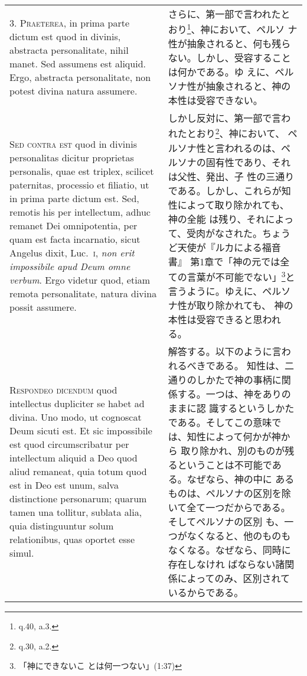 \documentclass[10pt]{jsarticle} %
\begin{document}
\begin{longtable}{p{21em}p{21em}}
3. {\scshape Praeterea}, in prima parte dictum est quod in divinis, abstracta
personalitate, nihil manet. Sed assumens est aliquid. Ergo, abstracta
personalitate, non potest divina natura assumere.


&

さらに、第一部で言われたとおり\footnote{q.40, a.3.}、神において、ペルソ
 ナ性が抽象されると、何も残らない。しかし、受容することは何かである。ゆ
 えに、ペルソナ性が抽象されると、神の本性は受容できない。

\\



{\scshape Sed contra est} quod in divinis personalitas dicitur proprietas
personalis, quae est triplex, scilicet paternitas, processio et
filiatio, ut in prima parte dictum est. Sed, remotis his per
intellectum, adhuc remanet Dei omnipotentia, per quam est facta
incarnatio, sicut Angelus dixit, Luc.~{\scshape i}, {\itshape non erit impossibile apud Deum
omne verbum}. Ergo videtur quod, etiam remota personalitate, natura
divina possit assumere.


&

しかし反対に、第一部で言われたとおり\footnote{q.30, a.2.}、神において、
 ペルソナ性と言われるのは、ペルソナの固有性であり、それは父性、発出、子
 性の三通りである。しかし、これらが知性によって取り除かれても、神の全能
 は残り、それによって、受肉がなされた。ちょうど天使が『ルカによる福音書』
 第1章で「神の元では全ての言葉が不可能でない」\footnote{「神にできないこ
 とは何一つない」(1:37)}と言うように。ゆえに、ペルソナ性が取り除かれても、
 神の本性は受容できると思われる。

\\



{\scshape Respondeo dicendum} quod intellectus dupliciter se habet ad divina. Uno
modo, ut cognoscat Deum sicuti est. Et sic impossibile est quod
circumscribatur per intellectum aliquid a Deo quod aliud remaneat, quia
totum quod est in Deo est unum, salva distinctione personarum; quarum
tamen una tollitur, sublata alia, quia distinguuntur solum relationibus,
quas oportet esse simul. 


&

解答する。以下のように言われるべきである。
知性は、二通りのしかたで神の事柄に関係する。一つは、神をありのままに認
 識するというしかたである。そしてこの意味では、知性によって何かが神から
 取り除かれ、別のものが残るということは不可能である。なぜなら、神の中に
 あるものは、ペルソナの区別を除いて全て一つだからである。そしてペルソナの区別
 も、一つがなくなると、他のものもなくなる。なぜなら、同時に存在しなけれ
 ばならない諸関係によってのみ、区別されているからである。



\end{longtable}
\end{document}
